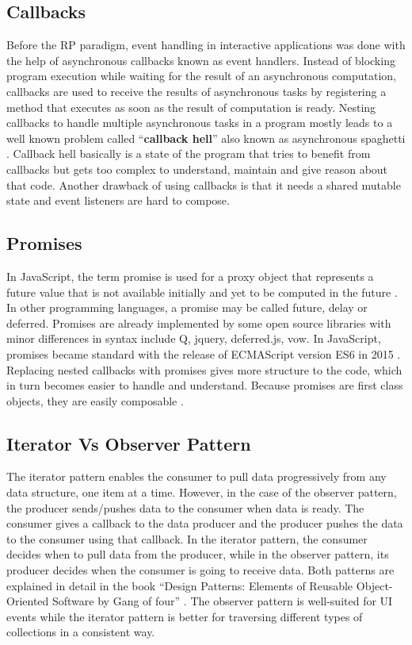 \subsection{Callbacks}
Before the RP paradigm, event handling in interactive applications was done with the help of asynchronous callbacks known as event handlers. 
Instead of blocking program execution while waiting for the result of an asynchronous computation, callbacks are used to receive the results of asynchronous tasks by registering a method that executes as soon as the result of computation is ready. Nesting callbacks to handle multiple asynchronous tasks in a program mostly leads to a well known problem called ``\textbf{callback hell}'' \cite{Kambona:2013:ERP:2489798.2489802} also known as asynchronous spaghetti \cite{SMLI-TR-2007-166}. Callback hell basically is a state of the program that tries to benefit from callbacks but gets too complex to understand, maintain and give reason about that code. Another drawback of using callbacks is that it needs a shared mutable state and event listeners are hard to compose.

\subsection{Promises}
In JavaScript, the term promise is used for a proxy object that represents a future value that is not available initially and yet to be computed in the future \cite{Kambona:2013:ERP:2489798.2489802}.  In other programming languages, a promise may be called future, delay or deferred. Promises are already implemented by some open source libraries with minor differences in syntax include Q, jquery, deferred.js, vow. In JavaScript, promises became standard with the release of ECMAScript version ES6 in 2015 \cite{ecmaScriptPromise}.
Replacing nested callbacks with promises gives more structure to the code, which in turn becomes easier to handle and understand. Because promises are first class objects, they are easily composable \cite{Kambona:2013:ERP:2489798.2489802}.

\subsection{Iterator Vs Observer Pattern}
The iterator pattern enables the consumer to pull data progressively from any data structure, one item at a time. However, in the case of the observer pattern, the producer sends/pushes data to the consumer when data is ready. The consumer gives a callback to the data producer and the producer pushes the data to the consumer using that callback. In the iterator pattern, the consumer decides when to pull data from the producer, while in the observer pattern, its producer decides when the consumer is going to receive data. Both patterns are explained in detail in the book ``Design Patterns: Elements of Reusable Object-Oriented Software by Gang of four'' \cite{Gamma:1995:DPE:186897}. The observer pattern is well-suited for UI events while the iterator pattern is better for traversing different types of collections in a consistent way.

